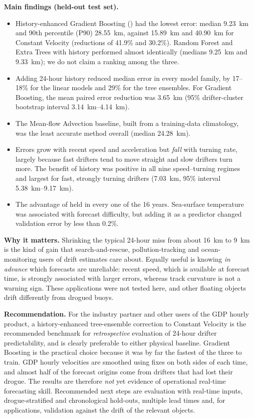 \textbf{Main findings (held-out test set).}
\begin{itemize}
  \item History-enhanced Gradient Boosting (\GBH) had the lowest error: median \SI{9.23}{km} and 90th percentile (P90) \SI{28.55}{km}, against \SI{15.89}{km} and \SI{40.90}{km} for Constant Velocity (reductions of 41.9\% and 30.2\%). Random Forest and Extra Trees with history performed almost identically (medians \SI{9.25}{km} and \SI{9.33}{km}); we do not claim a ranking among the three.
  \item Adding 24-hour history reduced median error in every model family, by 17--18\% for the linear models and 29\% for the tree ensembles. For Gradient Boosting, the mean paired error reduction was \SI{3.65}{km} (95\% drifter-cluster bootstrap interval \SIrange{3.14}{4.14}{km}).
  \item The Mean-flow Advection baseline, built from a training-data climatology, was the least accurate method overall (median \SI{24.28}{km}).
  \item Errors grow with recent speed and acceleration but \emph{fall} with turning rate, largely because fast drifters tend to move straight and slow drifters turn more. The benefit of history was positive in all nine speed--turning regimes and largest for fast, strongly turning drifters (\SI{7.03}{km}, 95\% interval \SIrange{5.38}{9.17}{km}).
  \item The advantage of \GBH{} held in every one of the 16 years. Sea-surface temperature was associated with forecast difficulty, but adding it as a predictor changed validation error by less than 0.2\%.
\end{itemize}

\textbf{Why it matters.} Shrinking the typical 24-hour miss from about \SI{16}{km} to \SI{9}{km} is the kind of gain that search-and-rescue, pollution-tracking and ocean-monitoring users of drift estimates care about. Equally useful is knowing \emph{in advance} which forecasts are unreliable: recent speed, which is available at forecast time, is strongly associated with larger errors, whereas track curvature is not a warning sign. These applications were not tested here, and other floating objects drift differently from drogued buoys.

\textbf{Recommendation.} For the industry partner and other users of the GDP hourly product, a history-enhanced tree-ensemble correction to Constant Velocity is the recommended benchmark for \emph{retrospective} evaluation of 24-hour drifter predictability, and is clearly preferable to either physical baseline. Gradient Boosting is the practical choice because it was by far the fastest of the three to train. GDP hourly velocities are smoothed using fixes on both sides of each time, and almost half of the forecast origins come from drifters that had lost their drogue. The results are therefore \emph{not} yet evidence of operational real-time forecasting skill. Recommended next steps are evaluation with real-time inputs, drogue-stratified and chronological hold-outs, multiple lead times and, for applications, validation against the drift of the relevant objects.
